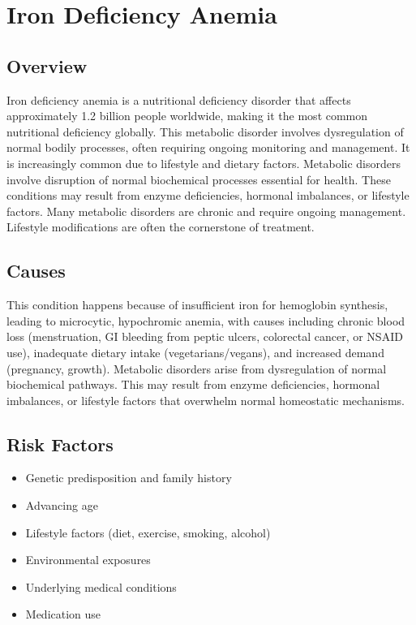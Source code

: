 \chapter{Iron Deficiency Anemia}
\label{sec:Iron Deficiency Anemia}

\section{Overview}
Iron deficiency anemia is a nutritional deficiency disorder that affects approximately 1.2 billion people worldwide, making it the most common nutritional deficiency globally. This metabolic disorder involves dysregulation of normal bodily processes, often requiring ongoing monitoring and management. It is increasingly common due to lifestyle and dietary factors. Metabolic disorders involve disruption of normal biochemical processes essential for health. These conditions may result from enzyme deficiencies, hormonal imbalances, or lifestyle factors. Many metabolic disorders are chronic and require ongoing management. Lifestyle modifications are often the cornerstone of treatment.
\section{Causes}
This condition happens because of insufficient iron for hemoglobin synthesis, leading to microcytic, hypochromic anemia, with causes including chronic blood loss (menstruation, GI bleeding from peptic ulcers, colorectal cancer, or NSAID use), inadequate dietary intake (vegetarians/vegans), and increased demand (pregnancy, growth). Metabolic disorders arise from dysregulation of normal biochemical pathways. This may result from enzyme deficiencies, hormonal imbalances, or lifestyle factors that overwhelm normal homeostatic mechanisms.   
\section{Risk Factors}
\begin{itemize}[noitemsep]
  \item Genetic predisposition and family history
  \item Advancing age
  \item Lifestyle factors (diet, exercise, smoking, alcohol)
  \item Environmental exposures
  \item Underlying medical conditions
  \item Medication use
\end{itemize}
